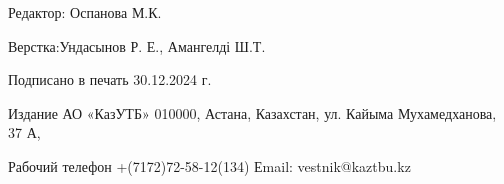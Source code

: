 \newpage

\thispagestyle{empty}
\null
\vfill
\begin{center}
Редактор: Оспанова М.К.

Верстка:Ундасынов Р. Е., Амангелді Ш.Т.

Подписано в печать 30.12.2024 г.

Издание АО «КазУТБ» 010000, Астана, Казахстан, ул. Кайыма Мухамедханова, 37 А,

Рабочий телефон +(7172)72-58-12(134) Еmail: vestnik@kaztbu.kz
\end{center}
\vfill
\null

